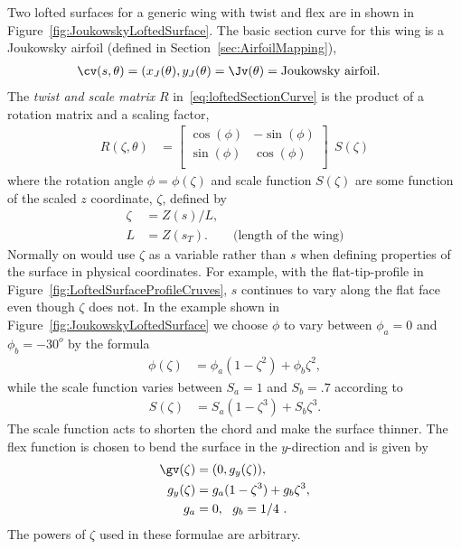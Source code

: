 Two lofted surfaces for a generic wing with twist and flex are in shown in Figure~\ref{fig:JoukowskyLoftedSurface}.
The basic section curve for this wing is a Joukowsky airfoil (defined in Section~\ref{sec:AirfoilMapping}), 
 \begin{align*}
  \cv(s,\theta) &= (x_J(\theta),y_J(\theta) =  \Jv(\theta) = \text{Joukowsky airfoil}.
\end{align*}
The {\em twist and scale matrix} $R$ in~\eqref{eq:loftedSectionCurve} is the product of
a rotation matrix and a scaling factor,
 \begin{align*}
  R(\zeta,\theta) &= \begin{bmatrix}
                   \cos(\phi) & -\sin(\phi) \\
                   \sin(\phi) & \cos(\phi) \\
                 \end{bmatrix} ~~ S(\zeta) 
\end{align*}
where the rotation angle $\phi=\phi(\zeta)$ and scale function $S(\zeta)$ are some function of the
scaled $z$ coordinate, $\zeta$, defined by 
\begin{align*}
   \zeta &= Z(s)/L, \\
    L &= Z(s_T) . \qquad \text{(length of the wing)}
\end{align*}
Normally on would use $\zeta$ as a variable rather than $s$ when defining properties of the surface in physical coordinates. 
For example, with the flat-tip-profile in Figure~\ref{fig:LoftedSurfaceProfileCruves}, $s$ continues to vary along
the flat face even though $\zeta$ does not.
In the example shown in Figure~\ref{fig:JoukowskyLoftedSurface}
we choose $\phi$ to vary between $\phi_a=0$ and $\phi_b=-30^o$ by the formula
\begin{align*}
  \phi(\zeta) &= \phi_a (1-\zeta^2) + \phi_b \zeta^2, 
\end{align*}
while the scale function varies between $S_a=1$ and $S_b=.7$ according to 
\begin{align*}
  S(\zeta) &= S_a (1-\zeta^3) + S_b \zeta^3 . 
\end{align*}
The scale function acts to shorten the chord and make the surface thinner.
The flex function is chosen to bend the surface in the $y$-direction and is given by
\begin{align*}
  \gv(\zeta) &= (0,g_y(\zeta)), \\
  g_y(\zeta) &= g_a (1-\zeta^3) + g_b \zeta^3, \\
  g_a&=0, ~~ g_b=1/4~ . 
\end{align*}
The powers of $\zeta$ used in these formulae are arbitrary.



